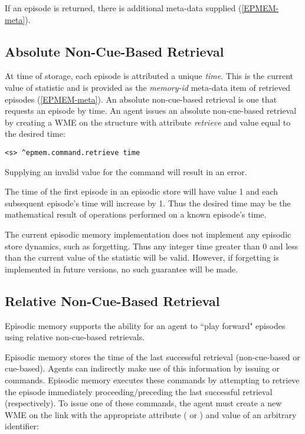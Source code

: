 If an episode is returned, there is additional meta-data supplied (\ref{EPMEM-meta}).

\subsection{Absolute Non-Cue-Based Retrieval}
At time of storage, each episode is attributed a unique \emph{time}.  
This is the current value of  statistic and is provided as the \emph{memory-id} meta-data item of retrieved episodes (\ref{EPMEM-meta}).  
An absolute non-cue-based retrieval is one that requests an episode by time.  
An agent issues an absolute non-cue-based retrieval by creating a WME on the  structure with attribute \emph{retrieve} and value equal to the desired time:

\begin{verbatim}
<s> ^epmem.command.retrieve time
\end{verbatim}

Supplying an invalid value for the  command will result in an error.

The time of the first episode in an episodic store will have value 1 and each subsequent episode's time will increase by 1.  
Thus the desired time may be the mathematical result of operations performed on a known episode's time.

The current episodic memory implementation does not implement any episodic store dynamics, such as forgetting.  
Thus any integer time greater than 0 and less than the current value of the  statistic will be valid.  
However, if forgetting is implemented in future versions, no such guarantee will be made.

\subsection{Relative Non-Cue-Based Retrieval}
Episodic memory supports the ability for an agent to ``play forward" episodes using relative non-cue-based retrievals. 

Episodic memory stores the time of the last successful retrieval (non-cue-based or cue-based).  
Agents can indirectly make use of this information by issuing  or  commands.  
Episodic memory executes these commands by attempting to retrieve the episode immediately proceeding/preceding the last successful retrieval (respectively).  
To issue one of these commands, the agent must create a new WME on the  link with the appropriate attribute ( or ) and value of an arbitrary identifier:

